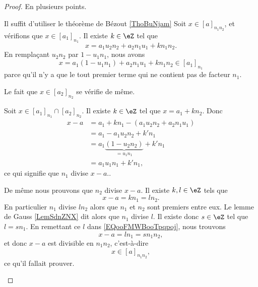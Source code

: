 \begin{proof}
	En plusieurs points.
	\begin{subproof}
		Il suffit d'utiliser le théorème de Bézout \ref{ThoBuNjam}
		Soit \( x\in[a]_{n_1n_2}\), et vérifions que \( x\in[a_1]_{n_1}\). Il existe \( k\in \eZ\) tel que
		\begin{equation}
			x=a_1u_2n_2+a_2n_1u_1+kn_1n_2.
		\end{equation}
		En remplaçant \( u_2n_2\) par \( 1-u_1n_1\), nous avons
		\begin{equation}
			x=a_1(1-u_1n_1)+a_2n_1u_1+kn_1n_2\in [a_1]_{n_1}
		\end{equation}
		parce qu'il n'y a que le tout premier terme qui ne contient pas de facteur \( n_1\).

		Le fait que \( x\in[a_2]_{n_2}\) se vérifie de même.

		Soit \( x\in [a_1]_{n_1}\cap [a_2]_{n_2}\). Il existe \( k\in \eZ\) tel que \( x=a_1+kn_2\). Donc
		\begin{subequations}
			\begin{align}
				x-a & =a_1+kn_1-(a_1u_2n_2+a_2n_1u_1)             \\
				    & =a_1-a_1u_2n_2+k'n_1                        \\
				    & =a_1\underbrace{(1-u_2n_2)}_{=u_1n_1}+k'n_1 \\
				    & =a_1u_1n_1+k'n_1,
			\end{align}
		\end{subequations}
		ce qui signifie que \( n_1\) divise \( x-a.\).

		De même nous prouvons que \( n_2\) divise \( x-a\). Il existe \( k,l\in \eZ\) tels que
		\begin{equation}        \label{EQooFMWBooTpqpoj}
			x-a=kn_1=ln_2.
		\end{equation}
		En particulier \( n_1\) divise \( ln_2\) alors que \( n_1\) et \( n_2\) sont premiers entre eux. Le lemme de Gauss \ref{LemSdnZNX} dit alors que \( n_1\) divise \( l\). Il existe donc \( s\in \eZ\) tel que \( l=sn_1\). En remettant ce \( l\) dans \eqref{EQooFMWBooTpqpoj}, nous trouvons
		\begin{equation}
			x-a=ln_1=sn_1n_2,
		\end{equation}
		et donc \( x-a\) est divisible en \( n_1n_2\), c'est-à-dire
		\begin{equation}
			x\in [a]_{n_1n_2},
		\end{equation}
		ce qu'il fallait prouver.
	\end{subproof}
\end{proof}

